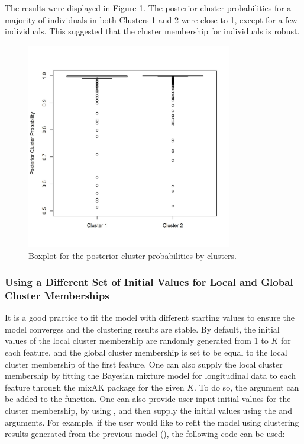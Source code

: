 The results were displayed in Figure \ref{fig:posterior_prob}. The posterior cluster probabilities for a majority of individuals in both Clusters 1 and 2 were close to 1, except for a few individuals. This suggested that the cluster membership for individuals is robust. 

\begin{figure}[t!]
\centering
\includegraphics[width=9cm,height=9cm]{./Figures/posterior_prob.JPEG}
\caption{\label{fig:posterior_prob}  Boxplot for the posterior cluster probabilities by clusters.}
\end{figure}

\subsubsection{Using a Different Set of Initial Values for Local and Global Cluster Memberships}

It is a good practice to fit the model with different starting values to ensure the model converges and the clustering results are stable. By default, the initial values of the local cluster membership are randomly generated from 1 to $K$ for each feature, and the global cluster membership is set to be equal to the local cluster membership of the first feature. One can also supply the local cluster membership by fitting the Bayesian mixture model for longitudinal data to each feature through the mixAK package for the given $K$. To do so, the argument  can be added to the  function. One can also provide user input initial values for the cluster membership, by using , and then supply the initial values using the  and  arguments. For example, if the user would like to refit the model using clustering results generated from the previous model  (), the following code can be used:  

